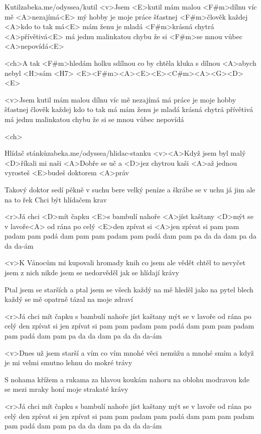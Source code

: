 \begin{song}[Chinaski]{63}{Kutil}{zabeka.me/odyssea/kutil}
<v>Jsem <E>kutil
mám malou <F#m>dílnu víc mě <A>nezajímá<E>
mý hobby je moje práce
šťastnej <F#m>člověk každej <A>kdo to tak má<E>
mám ženu
je mladá <F#m>krásná chytrá <A>přívětivá<E>
má jednu malinkatou chybu
že si <F#m>se mnou vůbec <A>nepovídá<E>

<ch>A tak <F#m>hledám holku sdílnou
co by chtěla kluka s dílnou
<A>abych nebyl <H>sám <H7>
<E><F#m><A><E><E><C#m><A><G><D><E>

<v>Jsem kutil
mám malou dílnu víc mě nezajímá
má práce je moje hobby
šťastnej člověk každej kdo to tak má
mám ženu
je mladá krásná chytrá přívětivá
má jednu malinkatou chybu
že si se mnou vůbec nepovídá

<ch>
\end{song}
\begin{song}{64}{Hlídač stánků}{zabeka.me/odyssea/hlidac-stanku}
<v><A>Když jsem byl malý <D>říkali mi naši
<A>Dobře se uč a <D>jez chytrou kaši
<A>až jednou vyrosteš <E>budeš doktorem <A>práv

Takový doktor sedí pěkně v suchu
bere velký peníze a škrábe se v uchu
já jim ale na to řek Chci být hlídačem krav

<r>Já chci <D>mít čapku <E>s bambulí nahoře
<A>jíst kaštany <D>mýt se v lavoře<A>
od rána po celý <E>den
zpívat si <A>jen zpívat si
pam pam padam pam padá dam
pam pam padam pam padá dam
pam pa da da dam pa da da da-ám

<v>K Vánocům mi kupovali hromady knih
co jsem ale vědět chtěl to nevyčet jsem z nich
nikde jsem se nedozvěděl jak se hlídají krávy

Ptal jsem se starších a ptal jsem se všech
každý na mě hleděl jako na pytel blech
každý se mě opatrně tázal na moje zdraví

<r>Já chci mít čapku s bambulí nahoře
jíst kaštany mýt se v lavoře
od rána po celý den
zpívat si jen zpívat si
pam pam padam pam padá dam
pam pam padam pam padá dam
pam pa da da dam pa da da da-ám

<v>Dnes už jsem starší a vím co vím
mnohé věci nemůžu a mnohé smím
a když je mi velmi smutno lehnu do mokré trávy

S nohama křížem a rukama za hlavou
koukám nahoru na oblohu modravou
kde se mezi mraky honí moje strakaté krávy

<r>Já chci mít čapku s bambulí nahoře
jíst kaštany mýt se v lavoře
od rána po celý den
zpívat si jen zpívat si
pam pam padam pam padá dam
pam pam padam pam padá dam
pam pa da da dam pa da da da-ám
\end{song}
